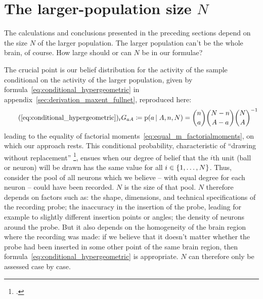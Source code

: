 \documentclass[\ifafour a4paper,12pt,\else a5paper,10pt,\fi%
onecolumn,oneside,article,%
british%
]{memoir}
\theoremstyle{remark}
\theoremstyle{innote}
\newcommand*{\citep}{\footcites}
\newcommand*{\defd}{\coloneqq}
\DeclarePairedDelimiter\set{\{}{\}}
\newcommand*{\pf}{\mathrm{p}}%
\renewcommand*{\|}{\nonscript\,\vert\nonscript\;\mathopen{}}
\newcommand*{\sect}{\S}%
\newcommand*{\chap}{ch.}%
\newcommand*{\labelbis}[1]{\tag*{(\ref{#1})$_\text{r}$}}
\newcommand*{\yG}{G}
\newcommand*{\yAv}{A}
\newcommand*{\yav}{a}
\newcommand*{\ya}{\yav}%
\newcommand*{\yA}{\yAv}%
\begin{document}
\section{The larger-population size $N$}
\label{sec:N}

%
% 

The calculations and conclusions presented in the preceding sections depend
on the size $N$ of the larger population. The larger population can't be
the whole brain, of course. How large should or can $N$ be in our formulae?

The crucial point is our belief distribution for the activity of the
sample conditional on the activity of the larger population, given by
formula~\eqref{eq:conditional_hypergeometric} in
appendix~\ref{sec:derivation_maxent_fullnet}, reproduced here:
\begin{equation}
  \labelbis{eq:conditional_hypergeometric}
  \yG_{\ya\yA} \defd \pf(\ya \|\yA, n,N)=
  \binom{n}{\ya}\binom{N-n}{\yA-\ya}\binom{N}{\yA}^{-1}
\end{equation}
leading to the equality of factorial
moments~\eqref{eq:equal_m_factorialmoments}, on which our approach rests.
This conditional probability, characteristic of \enquote{drawing without
  replacement}
\citep[\chap~3]{jaynes1994_r2003}[\sect~4.8.3]{ross1976_r2010}[\sect~II.6]{feller1950_r1968},
ensues when our degree of belief that the $i$th unit (ball or neuron) will
be drawn has the same value for all $i \in \set{1,\dotsc,N}$. Thus,
consider the pool of all neurons which we believe -- with equal degree for
each neuron -- could have been recorded. $N$ is the size of that pool. $N$
therefore depends on factors such as: the shape, dimensions, and technical
specifications of the recording probe; the inaccuracy in the insertion of
the probe, leading for example to slightly different insertion points or
angles; the density of neurons around the probe. But it also depends on the
homogeneity of the brain region where the recording was made: if we believe
that it doesn't matter whether the probe had been inserted in some other
point of the same brain region, then
formula~\eqref{eq:conditional_hypergeometric} is appropriate. $N$ can
therefore only be assessed case by case.
\end{document}
